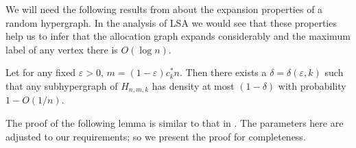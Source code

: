 We will need the following results from \cite{art:fps10} about the expansion properties of a random hypergraph. In the analysis of LSA we would see that these properties help us to infer that the allocation graph expands considerably and the maximum label of any vertex there is $O(\log n)$. 
\begin{theorem}\label{thm:density}
Let for any fixed $\varepsilon>0$, $m=(1-\varepsilon)c^*_k n$. Then there exists a $\delta =\delta(\varepsilon,k)$ such that any subhypergraph of $H_{n,m,k}$ has density at most $(1-\delta)$ with probability $1-O(1/n)$.
\end{theorem}
The proof of the following lemma is similar to that in \cite{art:fps10}. The parameters here are adjusted to our requirements; so we present the proof for completeness.

